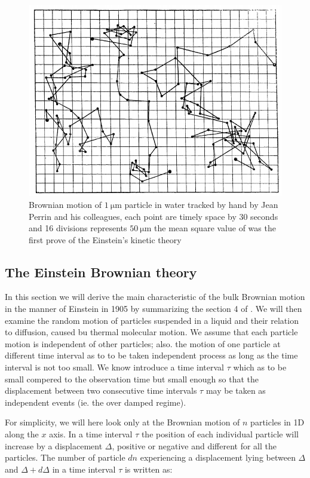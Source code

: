\begin{figure}[h]
	\centering
	\includegraphics[scale=0.6]{02_body/chapter1/image/graph_perrin.png}
	\caption{Brownian motion of $1 ~ \mathrm{\mu m}$ particle in water tracked by hand by Jean Perrin and his colleagues, each point are timely space by 30 seconds and 16 divisions represents $50 ~ \mathrm{\mu m}$  the mean square value of was the first prove of the Einstein's kinetic theory}
	\label{fig:Perrin_Brownian}
\end{figure}

\subsection{The Einstein Brownian theory}

In this section we will derive the main characteristic of the bulk Brownian motion in the manner of Einstein in 1905 by summarizing the section 4 of \cite{einstein_uber_1905}. We will then examine  the random motion of particles suspended in a liquid and their relation to diffusion, caused bu thermal molecular motion. We assume that each particle motion is independent of other particles; also. the motion of one particle at different time interval as to to be taken independent process as long as the time interval is not too small. We know introduce a time interval $\tau$ which as to be small compered to the observation time but small enough so that  the displacement between two consecutive time intervals $\tau$ may be taken as independent events (ie. the over damped regime). 

For simplicity, we will here look only at the Brownian motion of $n$ particles in 1D along the $x$ axis. In a time interval $\tau$ the position of each individual particle will increase by a displacement $\Delta$, positive or negative and different for all the particles. The number of particle $dn$ experiencing a displacement lying between $\Delta$ and $\Delta + d\Delta$ in a time interval $\tau$ is written as:

